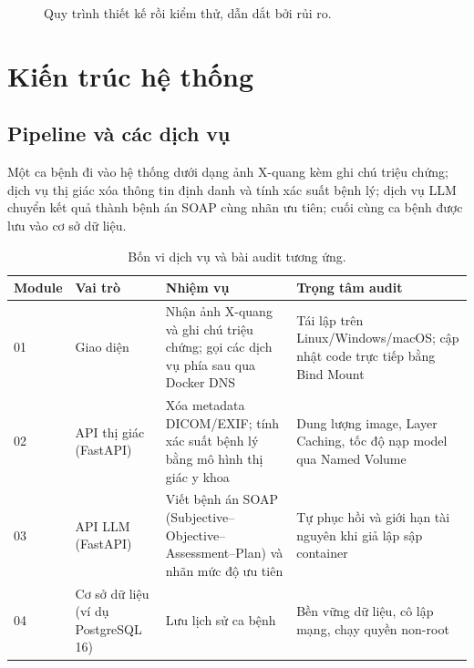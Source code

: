 \documentclass[11pt,a4paper]{article}
\begin{document}
\begin{figure}[h]
\centering
{}
\caption{Quy trình thiết kế rồi kiểm thử, dẫn dắt bởi rủi ro.}
\end{figure}

\section{Kiến trúc hệ thống}
\subsection{Pipeline và các dịch vụ}
Một ca bệnh đi vào hệ thống dưới dạng ảnh X-quang kèm ghi chú triệu chứng; dịch vụ thị giác xóa thông tin định danh và tính xác suất bệnh lý; dịch vụ LLM chuyển kết quả thành bệnh án SOAP cùng nhãn ưu tiên; cuối cùng ca bệnh được lưu vào cơ sở dữ liệu.

\begin{table}[h]
\centering
\small
\begin{tabularx}{\textwidth}{@{}l l X X@{}}
\toprule
\textbf{Module} & \textbf{Vai trò} & \textbf{Nhiệm vụ} & \textbf{Trọng tâm audit} \\
\midrule
01 & Giao diện & Nhận ảnh X-quang và ghi chú triệu chứng; gọi các dịch vụ phía sau qua Docker DNS & Tái lập trên Linux/Windows/macOS; cập nhật code trực tiếp bằng Bind Mount \\
02 & API thị giác (FastAPI) & Xóa metadata DICOM/EXIF; tính xác suất bệnh lý bằng mô hình thị giác y khoa & Dung lượng image, Layer Caching, tốc độ nạp model qua Named Volume \\
03 & API LLM (FastAPI) & Viết bệnh án SOAP (Subjective--Objective--Assessment--Plan) và nhãn mức độ ưu tiên & Tự phục hồi và giới hạn tài nguyên khi giả lập sập container \\
04 & Cơ sở dữ liệu (ví dụ PostgreSQL 16) & Lưu lịch sử ca bệnh & Bền vững dữ liệu, cô lập mạng, chạy quyền non-root \\
\bottomrule
\end{tabularx}
\caption{Bốn vi dịch vụ và bài audit tương ứng.}
\end{table}
\end{document}
